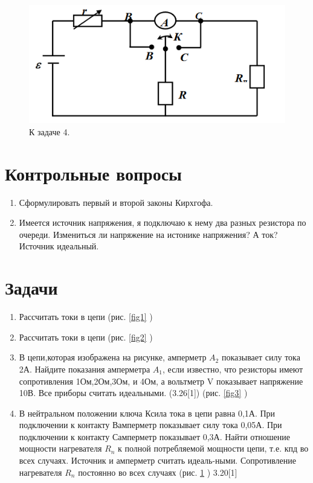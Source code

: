 \documentclass[a4paper,12pt]{article} %
\begin{document}
\begin{figure}[H]
\centering
  \includegraphics[width=0.5\linewidth]{4.png}
  \caption{К задаче 4.}
  \label{fig4}
\end{figure}

\section{Контрольные вопросы}
\begin{enumerate}

\item Сформулировать первый и второй законы Кирхгофа.
\item Имеется источник напряжения, я подключаю к нему два разных резистора по очереди. Измениться ли напряжение на истонике напряжения? А ток? Источник идеальный.
\end{enumerate}


\section{Задачи}
\begin{enumerate}
\item Рассчитать токи в цепи (рис. \ref{fig1} )
\item Рассчитать токи в цепи  (рис. \ref{fig2} )

\item В  цепи,которая  изображена  на рисунке, амперметр $A_2$ показывает  силу тока 2А.  Найдите  показания  амперметра $A_1$,  если  известно,  что  резисторы  имеют сопротивления 1Ом,2Ом,3Ом, и 4Ом, а вольтметр V показывает напряжение 10В. Все приборы считать идеальными. (3.26[1])  (рис. \ref{fig3} )

\item В нейтральном  положении  ключа Ксила  тока  в  цепи  равна 0,1А. При подключении к контакту Вамперметр показывает силу тока 0,05А. При подключении к  контакту Самперметр показывает  0,3А.  Найти отношение    мощности нагревателя $R_n $ к   полной потребляемой  мощности цепи,  т.е.  кпд  во  всех случаях.  Источник  и  амперметр  считать  идеаль-ными. Сопротивление нагревателя $R_n $ постоянно во всех случаях  (рис. \ref{fig4} ) 3.20[1]

\end{enumerate}
\end{document}
